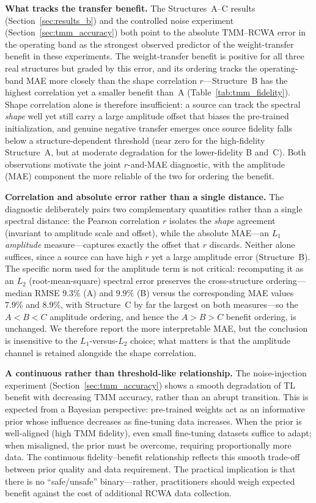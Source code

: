 \documentclass[a4paper,fleqn]{cas-sc}
\begin{document}
\textbf{What tracks the transfer benefit.} The Structures~A--C results (Section~\ref{sec:results_b}) and the controlled noise experiment (Section~\ref{sec:tmm_accuracy}) both point to the absolute TMM--RCWA error in the operating band as the strongest observed predictor of the weight-transfer benefit in these experiments. The weight-transfer benefit is positive for all three real structures but graded by this error, and its ordering tracks the operating-band MAE more closely than the shape correlation $r$---Structure~B has the highest correlation yet a smaller benefit than~A (Table~\ref{tab:tmm_fidelity}). Shape correlation alone is therefore insufficient: a source can track the spectral \emph{shape} well yet still carry a large amplitude offset that biases the pre-trained initialization, and genuine negative transfer emerges once source fidelity falls below a structure-dependent threshold (near zero for the high-fidelity Structure~A, but at moderate degradation for the lower-fidelity B and~C). Both observations motivate the joint $r$-and-MAE diagnostic, with the amplitude (MAE) component the more reliable of the two for ordering the benefit.

\textbf{Correlation and absolute error rather than a single distance.} The diagnostic deliberately pairs two complementary quantities rather than a single spectral distance: the Pearson correlation $r$ isolates the \emph{shape} agreement (invariant to amplitude scale and offset), while the absolute MAE---an $L_1$ \emph{amplitude} measure---captures exactly the offset that $r$ discards. Neither alone suffices, since a source can have high $r$ yet a large amplitude error (Structure~B). The specific norm used for the amplitude term is not critical: recomputing it as an $L_2$ (root-mean-square) spectral error preserves the cross-structure ordering---median RMSE $9.3\%$ (A) and $9.9\%$ (B) versus the corresponding MAE values $7.9\%$ and $8.9\%$, with Structure~C by far the largest on both measures---so the $A<B<C$ amplitude ordering, and hence the $A>B>C$ benefit ordering, is unchanged. We therefore report the more interpretable MAE, but the conclusion is insensitive to the $L_1$-versus-$L_2$ choice; what matters is that the amplitude channel is retained alongside the shape correlation.

\textbf{A continuous rather than threshold-like relationship.} The noise-injection experiment (Section~\ref{sec:tmm_accuracy}) shows a smooth degradation of TL benefit with decreasing TMM accuracy, rather than an abrupt transition. This is expected from a Bayesian perspective: pre-trained weights act as an informative prior whose influence decreases as fine-tuning data increases. When the prior is well-aligned (high TMM fidelity), even small fine-tuning datasets suffice to adapt; when misaligned, the prior must be overcome, requiring proportionally more data. The continuous fidelity--benefit relationship reflects this smooth trade-off between prior quality and data requirement. The practical implication is that there is no ``safe/unsafe'' binary---rather, practitioners should weigh expected benefit against the cost of additional RCWA data collection.
\end{document}

